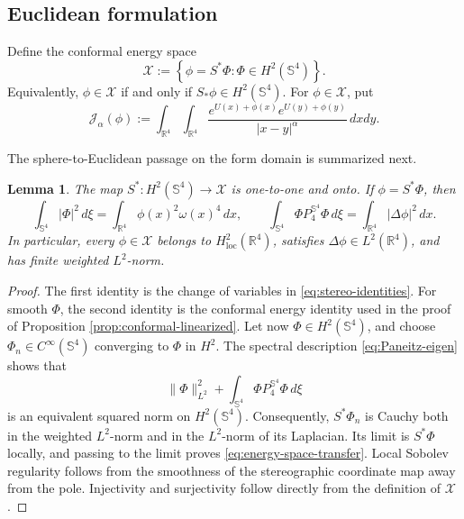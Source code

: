 \documentclass[11pt]{article}
\newtheorem{lemma}[theorem]{Lemma}
\numberwithin{equation}{section}
\begin{document}
\subsection{Euclidean formulation}

Define the conformal energy space
\begin{equation}\label{eq:Euclidean-X}
\mathcal X
:=\left\{\phi=S^{*}\Phi:\Phi\in H^{2}(\mathbb S^{4})\right\}.
\end{equation}
Equivalently, \(\phi\in\mathcal X\) if and only if
\(S_{*}\phi\in H^{2}(\mathbb S^{4})\). For \(\phi\in\mathcal X\), put
\begin{equation*}
\mathcal J_{\alpha}(\phi)
:=\int_{\mathbb R^{4}}\int_{\mathbb R^{4}}
\frac{e^{U(x)+\phi(x)}e^{U(y)+\phi(y)}}
{|x-y|^{\alpha}}\,dxdy.
\end{equation*}

The sphere-to-Euclidean passage on the form domain is summarized next.

\begin{lemma}\label{lem:energy-space-transfer}
The map \(S^{*}:H^{2}(\mathbb S^{4})\to\mathcal X\) is one-to-one and onto.
If \(\phi=S^{*}\Phi\), then
\begin{equation}\label{eq:energy-space-transfer}
\int_{\mathbb S^{4}}|\Phi|^{2}\,d\xi
=\int_{\mathbb R^{4}}\phi(x)^{2}\omega(x)^{4}\,dx,
\qquad
\int_{\mathbb S^{4}}\Phi P_{4}^{\mathbb S^{4}}\Phi\,d\xi
=\int_{\mathbb R^{4}}|\Delta\phi|^{2}\,dx.
\end{equation}
In particular, every \(\phi\in\mathcal X\) belongs to
\(H^{2}_{\operatorname{loc}}(\mathbb R^{4})\), satisfies
\(\Delta\phi\in L^{2}(\mathbb R^{4})\), and has finite weighted
\(L^{2}\)-norm.
\end{lemma}

\begin{proof}
The first identity is the change of variables in
\eqref{eq:stereo-identities}. For smooth \(\Phi\), the second identity is the
conformal energy identity used in the proof of Proposition
\ref{prop:conformal-linearized}. Let now \(\Phi\in H^{2}(\mathbb S^{4})\),
and choose \(\Phi_n\in C^{\infty}(\mathbb S^{4})\) converging to \(\Phi\) in
\(H^{2}\). The spectral description \eqref{eq:Paneitz-eigen} shows that
\[
\|\Phi\|_{L^{2}}^{2}
+\int_{\mathbb S^{4}}\Phi P_{4}^{\mathbb S^{4}}\Phi\,d\xi
\]
is an equivalent squared norm on \(H^{2}(\mathbb S^{4})\). Consequently,
\(S^{*}\Phi_n\) is Cauchy both in the weighted \(L^{2}\)-norm and in the
\(L^{2}\)-norm of its Laplacian. Its limit is \(S^{*}\Phi\) locally, and
passing to the limit proves \eqref{eq:energy-space-transfer}. Local Sobolev
regularity follows from the smoothness of the stereographic coordinate map
away from the pole. Injectivity and surjectivity follow directly from the
definition of \(\mathcal X\).
\end{proof}
\end{document}
